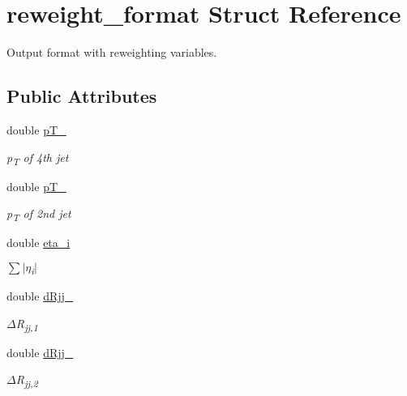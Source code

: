 \hypertarget{structreweight__format}{}\section{reweight\+\_\+format Struct Reference}
\label{structreweight__format}


Output format with reweighting variables.  


\subsection*{Public Attributes}
\begin{DoxyCompactItemize}
\item 
\mbox{\label{structreweight__format_a3afcea9a53b88314d6bdc3cf6c1eabcc}} 
double \mbox{\hyperlink{structreweight__format_a3afcea9a53b88314d6bdc3cf6c1eabcc}{p\+T\+\_}}
\begin{DoxyCompactList}\small\item\em p\textsubscript{T} of 4th jet \end{DoxyCompactList}\item 
\mbox{\label{structreweight__format_ae46f31c3cafb6cf3482707cd9ba11802}} 
double \mbox{\hyperlink{structreweight__format_ae46f31c3cafb6cf3482707cd9ba11802}{p\+T\+\_}}
\begin{DoxyCompactList}\small\item\em p\textsubscript{T} of 2nd jet \end{DoxyCompactList}\item 
\mbox{\label{structreweight__format_a2d2f3ec2385cadc8dced74b7c24c048a}} 
double \mbox{\hyperlink{structreweight__format_a2d2f3ec2385cadc8dced74b7c24c048a}{eta\+\_\+i}}
\begin{DoxyCompactList}\small\item\em {$\sum$}$\vert${$\eta$}\textsubscript{i}$\vert$ \end{DoxyCompactList}\item 
\mbox{\label{structreweight__format_a840f48a2970af5a5f9218513b7a7cfcf}} 
double \mbox{\hyperlink{structreweight__format_a840f48a2970af5a5f9218513b7a7cfcf}{d\+Rjj\+\_}}
\begin{DoxyCompactList}\small\item\em {$\Delta$}R\textsubscript{jj,1} \end{DoxyCompactList}\item 
\mbox{\label{structreweight__format_a597bb9f8cfd670c10c41d714695e5a46}} 
double \mbox{\hyperlink{structreweight__format_a597bb9f8cfd670c10c41d714695e5a46}{d\+Rjj\+\_}}
\begin{DoxyCompactList}\small\item\em {$\Delta$}R\textsubscript{jj,2} \end{DoxyCompactList}\end{DoxyCompactItemize}


